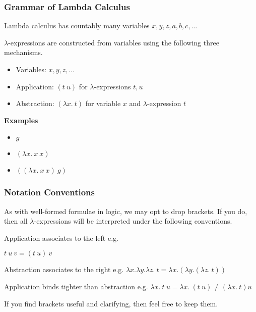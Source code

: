 \documentclass{beamer}
\begin{document}
\begin{frame}
	\frametitle{Grammar of Lambda Calculus}

	Lambda calculus has countably many variables $x,y,z,a,b,c,\dots$

	\vspace{0.5cm}

	$\lambda$-expressions are constructed from variables using the following three mechanisms.

	\begin{itemize}
		\item[] Variables: $x,y,z, \dots$
		\item[] Application: $(t \ u)$ for $\lambda$-expressions $t,u$
		\item[] Abstraction: $(\lambda x. \ t)$ for variable $x$ and $\lambda$-expression $t$
	\end{itemize}

	\vspace{0.2cm}

	{\bf Examples}
	
	\begin{itemize}
		\item[] $g$
		
		\item[] $(\lambda x. \ x \ x)$

		\item[] $((\lambda x. \ x \ x) \ g)$
	\end{itemize}

\end{frame}

\begin{frame}
	\frametitle{Notation Conventions}

	As with well-formed formulae in logic, we may opt to drop brackets. If you do, then all $\lambda$-expressions will be interpreted under the following conventions.

	\vspace{0.5cm}

	Application associates to the left e.g. 
	
	$t \ u \ v = (t \ u) \ v$

	\vspace{0.3cm}

	Abstraction associates to the right e.g. $\lambda x. \lambda y. \lambda z. \ t = \lambda x. (\lambda y. (\lambda z. \ t))$

	\vspace{0.3cm}

	Application binds tighter than abstraction e.g. $\lambda x. \ t \ u = \lambda x. \ (t \ u) \neq (\lambda x. \ t) u $ 

	\vspace{0.5cm}

	If you find brackets useful and clarifying, then feel free to keep them. 
	
\end{frame}
\end{document}
